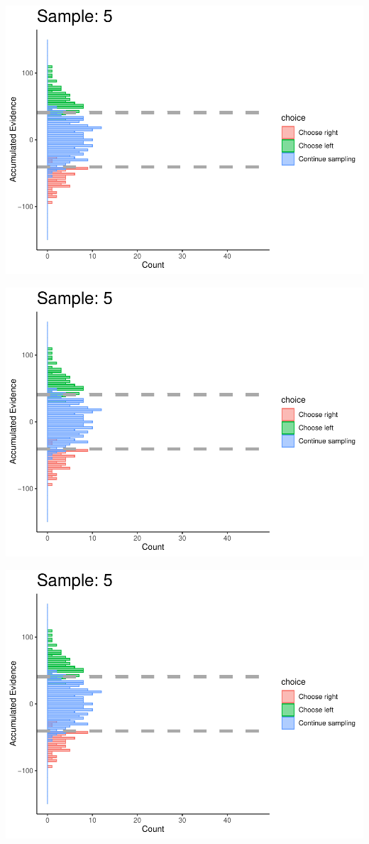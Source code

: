 \documentclass[
]{book}
\begin{document}
\begin{center}\includegraphics[width=0.8\linewidth]{LateNightBayes_files/figure-latex/collapsing_check-41} \end{center}

\begin{center}\includegraphics[width=0.8\linewidth]{LateNightBayes_files/figure-latex/collapsing_check-42} \end{center}

\begin{center}\includegraphics[width=0.8\linewidth]{LateNightBayes_files/figure-latex/collapsing_check-43} \end{center}
\end{document}
